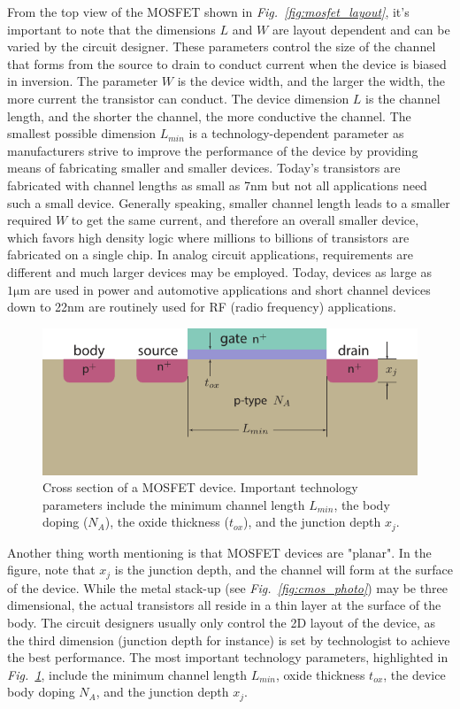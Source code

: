 From the top view of the MOSFET shown in \emph{Fig.~\ref{fig:mosfet_layout}}, it's important to note that the dimensions $L$ and $W$ are layout dependent and can be varied by the circuit designer.  These parameters control the size of the channel that forms from the source to drain to conduct current when the device is biased in inversion.  The parameter $W$ is the device width, and the larger the width, the more current the transistor can conduct.  The device dimension $L$ is the channel length, and  the shorter the channel, the more conductive the channel.  The smallest possible dimension $L_{min}$ is a technology-dependent parameter as manufacturers strive to improve the performance of the device by providing means of fabricating smaller and smaller devices.  Today's transistors are fabricated with channel lengths as small as 7nm but not all applications need such a small device.  Generally speaking, smaller channel length leads to a smaller required $W$ to get the same current, and therefore an overall smaller device, which favors high density logic where millions to billions of transistors are fabricated on a single chip.  In analog circuit applications, requirements are different and much larger devices may be employed.  Today, devices as large as $1\mathrm{\mu m}$ are used in power and automotive applications and short channel devices down to 22nm are routinely used for RF (radio frequency) applications.  
\begin{figure}[tb]
\centering
\includegraphics[width=.75\columnwidth]{mos_tech}
\caption{Cross section of a MOSFET device. Important technology parameters include the minimum channel length $L_{min}$, the body doping ($N_A$), the oxide thickness ($t_{ox}$), and the junction depth $x_j$.}
\label{fig:mos_tech}
\end{figure}
Another thing worth mentioning is that MOSFET devices are "planar".  In the figure, note that $x_j$ is the junction depth, and the channel will form at the surface of the device.  While the metal stack-up (see \emph{Fig.~\ref{fig:cmos_photo}}) may be three dimensional, the actual transistors all reside in a thin layer at the surface of the body.  The circuit designers usually only control the 2D layout of the device, as the third dimension (junction depth for instance) is set by technologist to achieve the best performance.  The most important technology parameters, highlighted in \emph{Fig.~\ref{fig:mos_tech}}, include the minimum channel length $L_{min}$, oxide thickness $t_{ox}$, the device body doping $N_A$, and the junction depth $x_j$.
